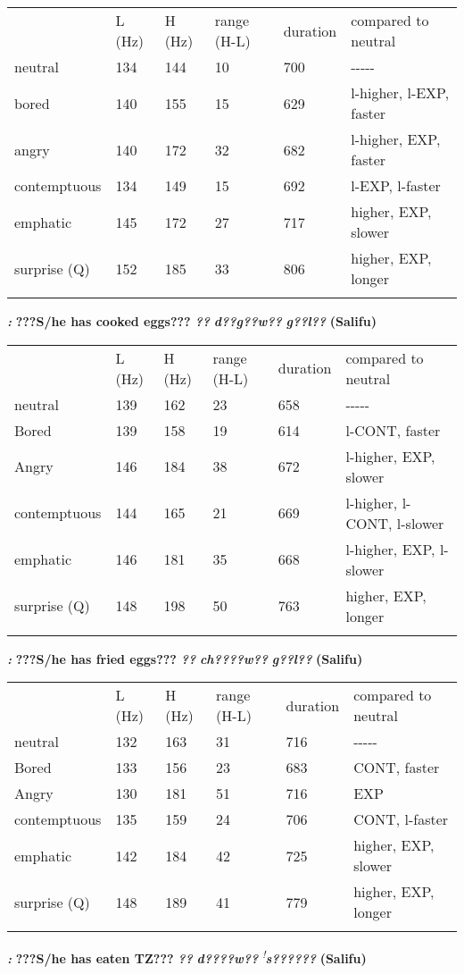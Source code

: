 \documentclass[output=paper]{langsci/langscibook}
\begin{document}
\begin{tabularx}{\textwidth}{XXXXXX} & L (Hz) & H (Hz) & range (H-L) & duration & compared to neutral\\
\lsptoprule
neutral & 134 & 144 & 10 & 700 & {}-{}-{}-{}-{}-\\
bored & 140 & 155 & 15 & 629 & l-higher, l-EXP, faster\\
angry & 140 & 172 & 32 & 682 & l-higher, EXP, faster\\
contemptuous & 134 & 149 & 15 & 692 & l-EXP, l-faster\\
emphatic & 145 & 172 & 27 & 717 & higher, EXP, slower\\
surprise (Q) & 152 & 185 & 33 & 806 & higher, EXP, longer\\
\lspbottomrule
\end{tabularx}
\textbf{ }\emph{\textbf{\textup{:}}}\textbf{ ???}\textbf{S/he has cooked eggs???  }\emph{\textbf{??}}\emph{\textbf{ d??g??}}\emph{\textbf{w??}}\emph{\textbf{ g??l??}}\textbf{  (Salifu)}

\begin{tabularx}{\textwidth}{XXXXXX} & L (Hz) & H (Hz) & range (H-L) & duration & compared to neutral\\
\lsptoprule
neutral & 139 & 162 & 23 & 658 & {}-{}-{}-{}-{}-\\
Bored & 139 & 158 & 19 & 614 & l-CONT, faster\\
Angry & 146 & 184 & 38 & 672 & l-higher, EXP, slower\\
contemptuous & 144 & 165 & 21 & 669 & l-higher, l-CONT, l-slower\\
emphatic & 146 & 181 & 35 & 668 & l-higher, EXP, l-slower\\
surprise (Q) & 148 & 198 & 50 & 763 & higher, EXP, longer\\
\lspbottomrule
\end{tabularx}
\emph{\textbf{\textup{:}}}\textbf{ ???S}\textbf{/he has fried eggs???   }\emph{\textbf{??}}\emph{\textbf{ ch????}}\emph{\textbf{w??}}\emph{\textbf{ g??l??}}\textbf{  (Salifu)}

\begin{tabularx}{\textwidth}{XXXXXX} & L (Hz) & H (Hz) & range (H-L) & duration & compared to neutral\\
\lsptoprule
neutral & 132 & 163 & 31 & 716 & {}-{}-{}-{}-{}-\\
Bored & 133 & 156 & 23 & 683 & CONT, faster\\
Angry & 130 & 181 & 51 & 716 & EXP\\
contemptuous & 135 & 159 & 24 & 706 & CONT, l-faster\\
emphatic & 142 & 184 & 42 & 725 & higher, EXP, slower\\
surprise (Q) & 148 & 189 & 41 & 779 & higher, EXP, longer\\
\lspbottomrule
\end{tabularx}
\emph{\textbf{\textup{:}}}\textbf{ ???S}\textbf{/he has eaten TZ???  }\emph{\textbf{??}}\emph{\textbf{ d????}}\emph{\textbf{w??}}\emph{\textbf{ }}\textit{\textsuperscript{!}}\emph{\textbf{s??????}}\textbf{  (Salifu)}
\end{document}
